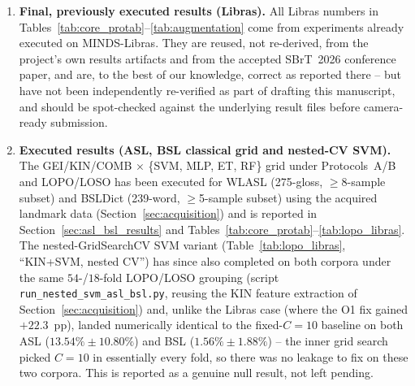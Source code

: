 \documentclass[journal]{IEEEtran}
\begin{document}
\begin{enumerate}
\item \textbf{Final, previously executed results (Libras).} All Libras numbers in Tables~\ref{tab:core_protab}--\ref{tab:augmentation} come from experiments already executed on MINDS-Libras. They are reused, not re-derived, from the project's own results artifacts and from the accepted SBrT~2026 conference paper, and are, to the best of our knowledge, correct as reported there -- but have not been independently re-verified as part of drafting this manuscript, and should be spot-checked against the underlying result files before camera-ready submission.
\item \textbf{Executed results (ASL, BSL classical grid and nested-CV SVM).} The GEI/KIN/COMB $\times$ \{SVM, MLP, ET, RF\} grid under Protocols~A/B and LOPO/LOSO has been executed for WLASL (275-gloss, $\geq$8-sample subset) and BSLDict (239-word, $\geq$5-sample subset) using the acquired landmark data (Section~\ref{sec:acquisition}) and is reported in Section~\ref{sec:asl_bsl_results} and Tables~\ref{tab:core_protab}--\ref{tab:lopo_libras}. The nested-GridSearchCV SVM variant (Table~\ref{tab:lopo_libras}, ``KIN+SVM, nested CV'') has since also completed on both corpora under the same $54$-/$18$-fold LOPO/LOSO grouping (script \texttt{run\_nested\_svm\_asl\_bsl.py}, reusing the KIN feature extraction of Section~\ref{sec:acquisition}) and, unlike the Libras case (where the O1 fix gained $+22.3$~pp), landed numerically identical to the fixed-$C{=}10$ baseline on both ASL ($13.54\%\pm10.80\%$) and BSL ($1.56\%\pm1.88\%$) -- the inner grid search picked $C{=}10$ in essentially every fold, so there was no leakage to fix on these two corpora. This is reported as a genuine null result, not left pending.

\end{enumerate}
\end{document}
